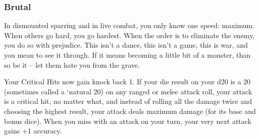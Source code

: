 \subsubsection{Brutal}

\begin{talent}
{In dismounted sparring and in live combat, you only know one speed: maximum. When others go hard, you go hardest. When the order is to eliminate the enemy, you do so with prejudice. This isn’t a dance, this isn’t a game, this is war, and you mean to see it through. If it means becoming a little bit of a monster, than so be it -- let them hate you from the grave.} 

Your Critical Hits now gain knock back 1. 
If your die result on your d20 is a 20 (sometimes called a ‘natural 20) on any ranged or melee attack roll, your attack is a critical hit, no matter what, and instead of rolling all the damage twice and choosing the highest result, your attack deals maximum damage (for its base and bonus dice). 
When you miss with an attack on your turn, your very next attack gains +1 accuracy.
\end{talent}